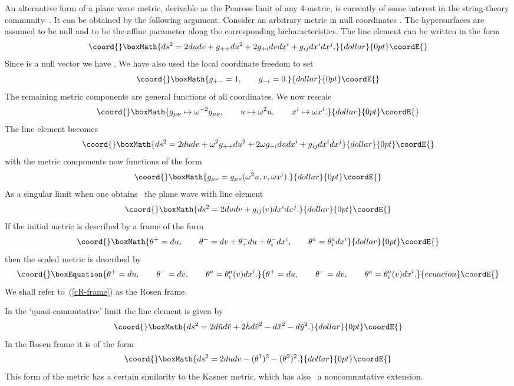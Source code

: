 \documentclass[12pt,a4paper]{article}
\newcounter{eg}
\def\t#1{\tilde #1}
\begin{document}
An alternative form of a plane wave metric, derivable as the Penrose
limit of any 4-metric, is currently of some interest in the
string-theory community~\cite{BlaFigHulPap02}. It can be obtained by
the following argument.  Consider an arbitrary metric in null
coordinates \coordHE{}. The hypersurfaces \coordHE{} are
assumed to be null and \coordHE{} to be the affine parameter along the
corresponding bicharacteristics.  The line element can be written in
the form
$$\coord{}\boxMath{
ds^2 = 2 du dv + g_{++} du^2 + 
2 g_{+i} dv dx^i + g_{ij} dx^i dx^j.
}{dollar}{0pt}\coordE{}$$
Since \coordHE{} is a null vector we have \coordHE{}. We have
also used the local coordinate freedom to set
$$\coord{}\boxMath{
g_{+-} = 1, \qquad g_{-i} = 0.
}{dollar}{0pt}\coordE{}$$
The remaining metric components are general functions of all
coordinates. We now rescale
$$\coord{}\boxMath{
g_{\mu\nu} \mapsto \omega^{-2} g_{\mu\nu}, \qquad
u \mapsto \omega^2 u, \qquad x^i \mapsto \omega x^i.
}{dollar}{0pt}\coordE{}$$
The line element becomes
$$\coord{}\boxMath{
ds^2 = 2 du dv + \omega^2 g_{++} du^2 + 
2 \omega g_{+i} du dx^i + g_{ij} dx^i dx^j
}{dollar}{0pt}\coordE{}$$
with the metric components now functions of the form
$$\coord{}\boxMath{
g_{\mu\nu} = g_{\mu\nu}(\omega^2 u, v, \omega x^i).
}{dollar}{0pt}\coordE{}$$
As a singular limit when \coordHE{} one
obtains~\cite{Pen76,BlaFigHulPap02} the plane wave with line element 
$$\coord{}\boxMath{
ds^2 = 2 du dv + g_{ij}(v) dx^i dx^j.
}{dollar}{0pt}\coordE{}$$
If the initial metric is described by a frame of the form
$$\coord{}\boxMath{
\theta^+ = du, \qquad
\theta^- = dv + \theta^-_+ du +  \theta^-_i dx^i,\qquad 
\theta^a =  \theta^a_i dx^i
}{dollar}{0pt}\coordE{}$$
then the scaled metric is described by
\begin{equation}\coord{}\boxEquation{
\theta^+ = du, \qquad
\theta^- = dv, \qquad \theta^a =  
\theta^a_i(v) dx^i.                         \label{cR-frame}
}{
\theta^+ = du, \qquad
\theta^- = dv, \qquad \theta^a =  
\theta^a_i(v) dx^i.                         }{ecuacion}\coordE{}\end{equation}
We shall refer to~(\ref{cR-frame}) as the Rosen frame. 

In the `quasi-commutative' limit the line element is given by
$$\coord{}\boxMath{
ds^2 = 2d\t{u} d\t{v} + 2\t{h} d\t{v}^2 - d\t{x}^2 - d\t{y}^2.
}{dollar}{0pt}\coordE{}$$
In the Rosen frame it is of the form
$$\coord{}\boxMath{
ds^2 = 2du dv - (\theta^1)^2 - (\theta^2)^2.
}{dollar}{0pt}\coordE{}$$
This form of the metric has a certain similarity to the Kasner
metric, which has also~\cite{MacMadZou02} a noncommutative extension.
\end{document}
